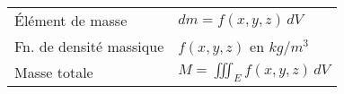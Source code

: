 \begin{tabular}{ll}
    Élément de masse & \(dm=f(x,y,z) \,dV \) \\
    Fn. de densité massique & \(f(x,y,z)\) en $kg/m^3$\\
    Masse totale & \(M = \iiint_E f(x,y,z) \,dV \)
\end{tabular}